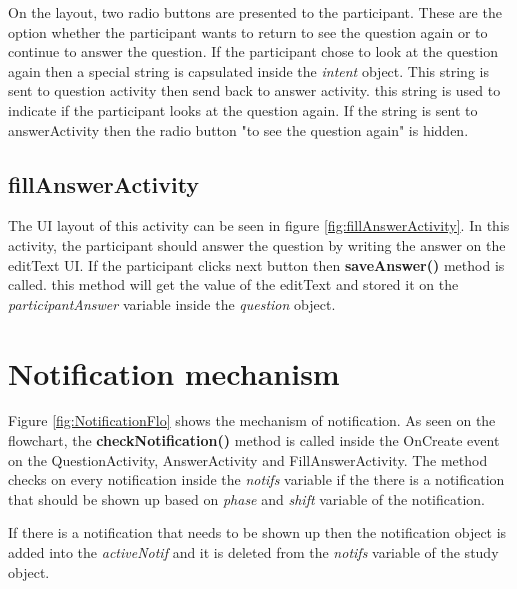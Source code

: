 On the layout, two radio buttons are presented to the participant. These are the option whether the participant wants to return to see the question again or to continue
 to answer the question.
If the participant chose to look at the question again then a special string is capsulated inside the \textit{intent} object.
This string is sent to question activity then send back to answer activity. this string is used to indicate if the participant looks at the question again.
If the string is sent to answerActivity then the radio button "to see the question again" is hidden.


\subsection{fillAnswerActivity}
The UI layout of this activity can be seen in figure \ref{fig:fillAnswerActivity}.
In this activity, the participant should answer the question by writing the answer on the editText UI.
If the participant clicks next button then \textbf{saveAnswer()} method is called. this method will get the value of the editText
and stored it on the \textit{participantAnswer} variable inside the \textit{question} object.


\section{Notification mechanism}
Figure \ref{fig:NotificationFlo} shows the mechanism of notification.
As seen on the flowchart, the \textbf{checkNotification()} method is called inside
the OnCreate event on the QuestionActivity, AnswerActivity and FillAnswerActivity.
The method checks on every notification inside the \textit{notifs} variable if the there is a notification that should be shown up based on \textit{phase} and \textit{shift} variable of the notification.

If there is a notification that needs to be shown up then the notification object is added into the \textit{activeNotif} and it is deleted from the \textit{notifs} variable of the study object.

